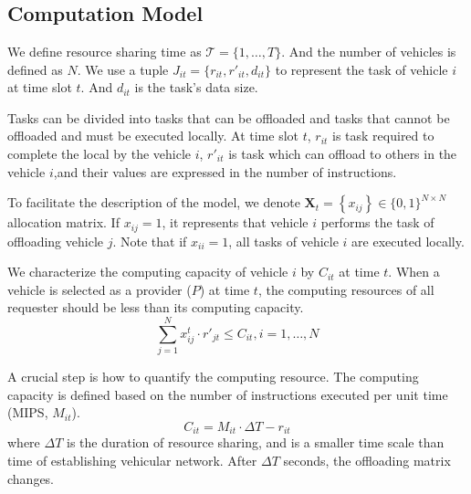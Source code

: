 \documentclass[conference]{IEEEtran}
\begin{document}
\section{}
	\subsection{Computation Model}
We define resource sharing time as $ \mathcal{T}=\{1, \ldots, T \}$. 
And the number of vehicles is defined as $N$. 
We use a tuple $J_{it} = \{r_ {it}, r'_ {it}, d_{it}\}$ to represent the task of vehicle $i$ at time slot $t$. And $d_{it}$ is the task's data size. 

Tasks can be divided into tasks that can be offloaded and tasks that cannot be offloaded and must be executed locally. 
At time slot $t$, 
$r_ {it}$ is task required to complete the local by the vehicle $i$, 
$r'_ {it}$ is task which can offload to others in the vehicle $i$,and their values are expressed in the number of instructions. 

To facilitate the description of the model, we denote $\mathbf{X}_{t}=\left\{x_{i j}\right\} \in\{0,1\}^{N \times N}$ allocation matrix. If $x_{ij}=1$, it represents that vehicle $i$ performs the task of offloading vehicle $j$. Note that if $x_{ii}=1$, all tasks of vehicle $i$ are executed locally. 

We characterize the computing capacity of vehicle $i$ by $C_ {it}$ at time $t$. When a vehicle is selected as a provider ($P$) at time $t$, the computing resources of all requester should be less than its computing capacity. 
\begin{equation}
	\sum    \limits_{ j= 1} ^{N}
	{ x_{ij}^{t} \cdot  r'_{jt}} \le C_{it}, i = 1, \dots, N
\end{equation}

A crucial step is how to quantify the computing resource. 
The computing capacity is defined based on the number of instructions executed per unit time (MIPS, $M_{it}$). 
\begin{equation}
	C_{it} = M_{it}   \cdot \Delta T 
	- r_{it}
	\label{cm}
\end{equation}
where $\Delta T$ is the duration of resource sharing, and is a smaller time scale than time of establishing vehicular network. After $\Delta T$ seconds, the offloading matrix changes. 
%
\end{document}
